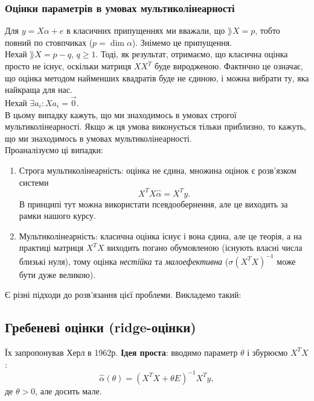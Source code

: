 \subsubsection{Оцінки параметрів в умовах мультиколінеарності}
Для $y=X\alpha+e$ в класичних припущеннях ми вважали, що $\rang X = p$, тобто повний по стовпчиках ($p = \dim \alpha$). Знімемо це припущення. \\

Нехай $\rang X = p - q$, $q \ge 1$. Тоді, як результат, отримаємо, що класична оцінка просто не існує, оскільки матриця $XX^T$ буде виродженою. Фактично це означає, що оцінка методом найменших квадратів буде не єдиною, і можна вибрати ту, яка найкраща для нас. \\

Нехай $\exists a_i: Xa_i=\vec0$. \\

В цьому випадку кажуть, що ми знаходимось в умовах строгої мультиколінеарності. Якщо ж ця умова  виконується тільки приблизно, то кажуть, що ми знаходимось в умовах мультиколінеарності. \\

Проаналізуємо ці випадки:
\begin{enumerate}
	\item Строга мультиколінеарність: оцінка не єдина, множина оцінок є розв’язком системи \[X^TX\widehat{\alpha}=X^Ty.\] В принципі тут можна використати псевдообернення, але це виходить за рамки нашого курсу.
	\item Мультиколінеарність: класична оцінка існує і вона єдина, але це теорія, а на практиці матриця $X^TX$ виходить погано обумовленою (існують власні числа близькі нуля), тому оцінка \textit{нестійка} та \textit{малоефективна} ($\sigma(X^TX)^{-1}$ може бути дуже великою).
\end{enumerate}
Є різні підходи до розв’язання цієї проблеми. Викладемо такий:
\subsection{Гребеневі оцінки (ridge-оцінки)}
Їх запропонував Херл в 1962р. \textbf{Ідея проста}: вводимо параметр $\theta$ і збурюємо $X^TX$:
\[ \widehat{\alpha}(\theta)=(X^TX+\theta E)^{-1}X^Ty,\] де $\theta > 0$, але досить мале.\\

